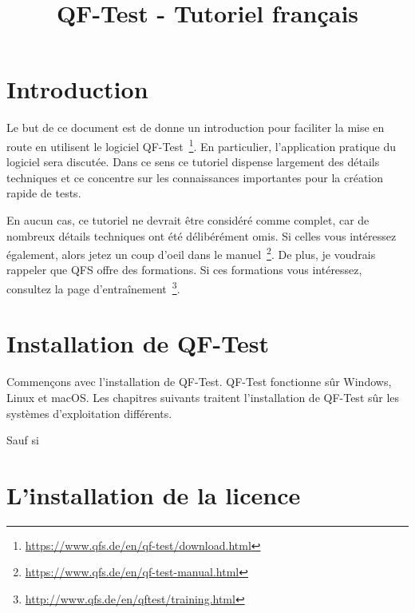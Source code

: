 \documentclass{article}
\begin{document}
\title{QF-Test - Tutoriel français}
\maketitle

\section{Introduction}
\par{
Le but de ce document est de donne un introduction pour faciliter la mise en route en utilisent le logiciel
QF-Test~\footnote{\url{https://www.qfs.de/en/qf-test/download.html}}. En particulier, l'application pratique
du logiciel sera discutée. Dans ce sens ce tutoriel dispense largement des détails techniques et ce concentre
sur les connaissances importantes pour la création rapide de tests.
}
\par{
En aucun cas, ce tutoriel ne devrait être considéré comme complet, car de nombreux détails techniques ont été
délibérément omis. Si celles vous intéressez également, alors jetez un coup d'oeil dans le
manuel~\footnote{\url{https://www.qfs.de/en/qf-test-manual.html}}. De plus, je voudrais rappeler que QFS
offre des formations. Si ces formations vous intéressez, consultez
la page d'entraînement~\footnote{\url{http://www.qfs.de/en/qftest/training.html}}.
}

\section{Installation de QF-Test}
\par{
Commençons avec l'installation de QF-Test. QF-Test fonctionne sûr Windows, Linux et macOS. Les chapitres
suivants traitent l'installation de QF-Test sûr les systèmes d'exploitation différents.
}
\par{
Sauf si 
}

\section{L'installation de la licence}
\par{
}
\end{document}

